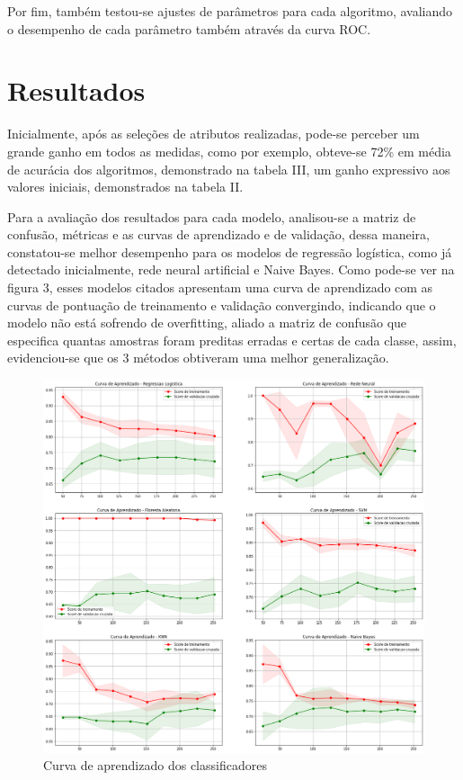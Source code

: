 \documentclass[10pt, conference, compsocconf]{IEEEtran}
\begin{document}
Por fim, também testou-se ajustes de parâmetros para cada algoritmo, avaliando o desempenho de cada parâmetro também através da curva ROC.

\section{Resultados}
Inicialmente, após as seleções de atributos realizadas, pode-se perceber um grande ganho em todos as medidas, como por exemplo, obteve-se 72\% em média de acurácia dos algoritmos, demonstrado na tabela III, um ganho expressivo aos valores iniciais, demonstrados na tabela II. 

\begin{table}[]
\caption{Métricas dos algoritmos para a base com 72 atributos}
\centering
{}
\end{table}

Para a avaliação dos resultados para cada modelo, analisou-se a matriz de confusão, métricas e as curvas de aprendizado e de validação, dessa maneira, constatou-se melhor desempenho para os modelos de regressão logística, como já detectado inicialmente, rede neural artificial e Naive Bayes. Como pode-se ver na figura 3, esses modelos citados apresentam uma curva de aprendizado com as curvas de pontuação de treinamento e validação convergindo, indicando que o modelo não está sofrendo de overfitting, aliado a matriz de confusão que especifica quantas amostras foram preditas erradas e certas de cada classe, assim, evidenciou-se que os 3 métodos obtiveram uma melhor generalização.

\begin{figure}
  \centering
  \includegraphics[width=.45\textwidth]{curva.png}
  \caption{Curva de aprendizado dos classificadores}
\label{fig:short}
\end{figure}
\end{document}
